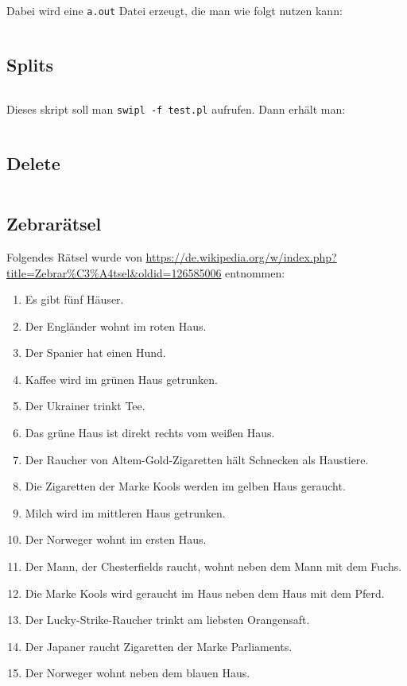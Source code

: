 Dabei wird eine \texttt{a.out} Datei erzeugt, die man wie folgt
nutzen kann:
\inputminted[numbersep=5pt, tabsize=4]{bash}{scripts/prolog/human-2.sh}

\subsection{Splits}
\inputminted[linenos, numbersep=5pt, tabsize=4, frame=lines, label=splits.pl]{prolog}{scripts/prolog/splits.pl}

Dieses skript soll man \texttt{swipl -f test.pl} aufrufen. Dann erhält man:

\inputminted[numbersep=5pt, tabsize=4]{prolog}{scripts/prolog/splits.sh}

\subsection{Delete}%
\inputminted[numbersep=5pt, tabsize=4]{prolog}{scripts/prolog/delete.pl}

\subsection{Zebrarätsel}
Folgendes Rätsel wurde von \url{https://de.wikipedia.org/w/index.php?title=Zebrar%C3%A4tsel&oldid=126585006}
entnommen:

\begin{enumerate}
    \item Es gibt fünf Häuser.
    \item Der Engländer wohnt im roten Haus.
    \item Der Spanier hat einen Hund.
    \item Kaffee wird im grünen Haus getrunken.
    \item Der Ukrainer trinkt Tee.
    \item Das grüne Haus ist direkt rechts vom weißen Haus.
    \item Der Raucher von Altem-Gold-Zigaretten hält Schnecken als Haustiere.
    \item Die Zigaretten der Marke Kools werden im gelben Haus geraucht.
    \item Milch wird im mittleren Haus getrunken.
    \item Der Norweger wohnt im ersten Haus.
    \item Der Mann, der Chesterfields raucht, wohnt neben dem Mann mit dem Fuchs.
    \item Die Marke Kools wird geraucht im Haus neben dem Haus mit dem Pferd.
    \item Der Lucky-Strike-Raucher trinkt am liebsten Orangensaft.
    \item Der Japaner raucht Zigaretten der Marke Parliaments.
    \item Der Norweger wohnt neben dem blauen Haus.
\end{enumerate}

